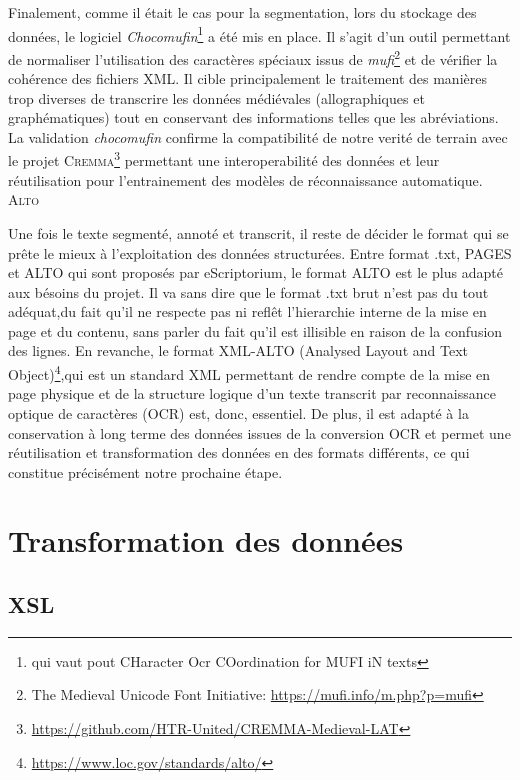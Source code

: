 \documentclass[a4paper, twoside, 12pt]{book}
\begin{document}
Finalement, comme il était le cas pour la segmentation, lors du stockage des données, le logiciel \textit{Chocomufin}\footnote{ qui vaut pout CHaracter Ocr COordination for MUFI iN texts\cite{Clerice_Choco-Mufin_a_tool_2021}} a été mis en place. Il s'agit d'un outil permettant de normaliser l'utilisation des caractères spéciaux issus de \textit{mufi}\footnote{The Medieval Unicode Font Initiative: \url{https://mufi.info/m.php?p=mufi}} et de vérifier la cohérence des fichiers XML. Il cible principalement le traitement des manières trop diverses de transcrire les données médiévales (allographiques et graphématiques) tout en conservant des informations telles que les abréviations. La validation \textit{chocomufin} confirme la compatibilité de notre verité de terrain avec le projet \textsc{Cremma}\footnote{\url{https://github.com/HTR-United/CREMMA-Medieval-LAT}} permettant une interoperabilité des données et leur réutilisation pour l'entrainement des modèles de réconnaissance automatique. \\

\textsc{Alto}

Une fois le texte segmenté, annoté et transcrit, il reste de décider le format qui se prête le mieux à l'exploitation des données structurées. Entre format .txt, PAGES et ALTO qui sont proposés par eScriptorium, le format ALTO est le plus adapté aux bésoins du projet. Il va sans dire que le format .txt brut n'est pas du tout adéquat,du fait qu'il ne respecte pas ni reflêt l'hierarchie interne de la mise en page et du contenu, sans parler du fait qu'il est illisible en raison de la confusion des lignes. En revanche, le format XML-ALTO (Analysed Layout and Text Object)\footnote{\url{https://www.loc.gov/standards/alto/}},qui est un standard XML permettant de rendre compte de la mise en page physique et de la structure logique d'un texte transcrit par reconnaissance optique de caractères (OCR) est, donc, essentiel. De plus, il est adapté à la conservation à long terme des données issues de la conversion OCR et permet une réutilisation et transformation des données en des formats différents, ce qui constitue précisément notre prochaine étape.\\

\section{Transformation des données}

\subsection{XSL}
\end{document}
